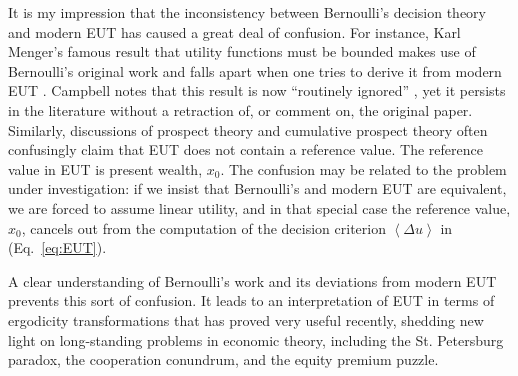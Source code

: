 \documentclass[pdftex]{article}
\newcommand{\ave}[1]{\left\langle#1 \right\rangle}
\newcommand{\eref}[1]{(Eq.~\ref{eq:#1})}
\newcommand{\Du}{\Delta u}
\begin{document}
It is my impression that the inconsistency between Bernoulli's decision theory and modern EUT has caused a great deal of confusion. For instance, Karl Menger's famous result that utility functions must be bounded \cite{Menger1934} makes use of Bernoulli's original work and falls apart when one tries to derive it from modern EUT \cite{Peters2011c,PetersGell-Mann2016}. Campbell notes that this result is now ``routinely ignored'' \cite[p.~5]{Campbell2017}, yet it persists in the literature without a retraction of, or comment on, the original paper. Similarly, discussions of prospect theory and cumulative prospect theory often confusingly claim that EUT does not contain a reference value. The reference value in EUT is present wealth, $x_0$. The confusion may be related to the problem under investigation: if we insist that Bernoulli's and modern EUT are equivalent, we are forced to assume linear utility, and in that special case the reference value, $x_0$, cancels out from the computation of the decision criterion $\ave{\Du}$ in \eref{EUT}.

A clear understanding of Bernoulli's work and its deviations from modern EUT prevents this sort of confusion. It leads to an interpretation of EUT in terms of ergodicity transformations that has proved very useful recently, shedding new light on long-standing problems in economic theory, including the St. Petersburg paradox, the cooperation conundrum, and the equity premium puzzle.



\end{document}
